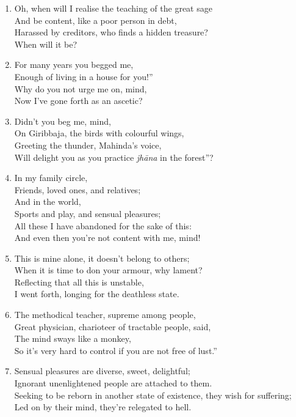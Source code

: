 \documentclass[10pt, openany]{book}
\newcommand*{\vleftofline}[1]{\leavevmode\llap{#1}}
\begin{document}
\begin{enumerate}
\item Oh, when will I realise the teaching of the great sage\\
And be content, like a poor person in debt,\\
Harassed by creditors, who finds a hidden treasure?\\
When will it be?

\item For many years you begged me,\\
\vleftofline{“}Enough of living in a house for you!”\\
Why do you not urge me on, mind,\\
Now I’ve gone forth as an ascetic?

\item Didn’t you beg me, mind,\\
\vleftofline{“}On Giribbaja, the birds with colourful wings,\\
Greeting the thunder, Mahinda’s voice,\\
Will delight you as you practice \emph{jhāna} in the forest”?

\item In my family circle, \\
Friends, loved ones, and relatives;\\
And in the world, \\
Sports and play, and sensual pleasures;\\
All these I have abandoned for the sake of this:\\
And even then you’re not content with me, mind!

\item This is mine alone, it doesn’t belong to others;\\
When it is time to don your armour, why lament?\\
Reflecting that all this is unstable,\\
I went forth, longing for the deathless state.

\item The methodical teacher, supreme among people,\\
Great physician, charioteer of tractable people, said,\\
\vleftofline{“}The mind sways like a monkey,\\
So it’s very hard to control if you are not free of lust.”

\item Sensual pleasures are diverse, sweet, delightful;\\
Ignorant unenlightened people are attached to them.\\
Seeking to be reborn in another state of existence, they wish for suffering;\\
Led on by their mind, they’re relegated to hell.


\end{enumerate}
\end{document}
